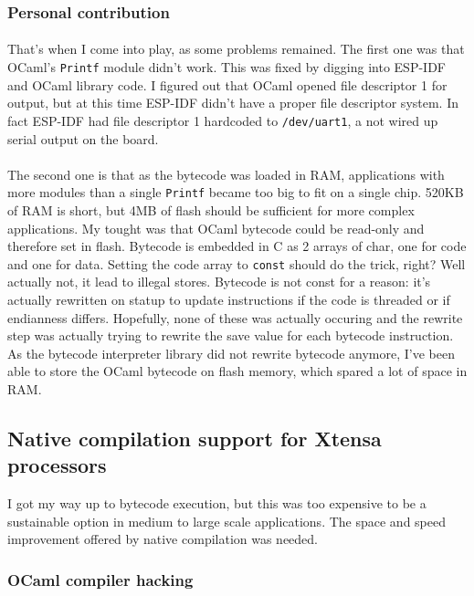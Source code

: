 \documentclass[a4paper]{article}
\begin{document}
\subsubsection{Personal contribution}
\paragraph{}
That's when I come into play, as some problems remained. The first one was that OCaml's \texttt{Printf} module didn't work. This was fixed by digging into ESP-IDF and OCaml library code. I figured out that OCaml opened file descriptor 1 for output, but at this time ESP-IDF didn't have a proper file descriptor system. In fact ESP-IDF had file descriptor 1 hardcoded to \texttt{/dev/uart1}, a not wired up serial output on the board.
\paragraph{}
The second one is that as the bytecode was loaded in RAM, applications with more modules than a single \texttt{Printf} became too big to fit on a single chip. 520KB of RAM is short, but 4MB of flash should be sufficient for more complex applications. 
My tought was that OCaml bytecode could be read-only and therefore set in flash. Bytecode is embedded in C as 2 arrays of char, one for code and one for data. Setting the code array to \texttt{const} should do the trick, right? Well actually not, it lead to illegal stores. Bytecode is not const for a reason: it's actually rewritten on statup to update instructions if the code is threaded or if endianness differs. 
Hopefully, none of these was actually occuring and the rewrite step was actually trying to rewrite the save value for each bytecode instruction. 
As the bytecode interpreter library did not rewrite bytecode anymore, I've been able to store the OCaml bytecode on flash memory, which spared a lot of space in RAM. 


\subsection{Native compilation support for Xtensa processors}

I got my way up to bytecode execution, but this was too expensive to be a sustainable option in medium to large scale applications. The space and speed improvement offered by native compilation was needed. 

\subsubsection{OCaml compiler hacking}
\end{document}
